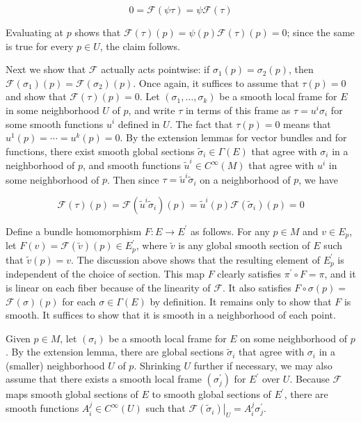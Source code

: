 \documentclass[10pt, letterpaper]{article}
\begin{document}
$$
0=\mathscr{F}(\psi \tau)=\psi \mathscr{F}(\tau)
$$

Evaluating at $p$ shows that $\mathscr{F}(\tau)(p)=\psi(p) \mathscr{F}(\tau)(p)=0$; since the same is true for every $p \in U$, the claim follows.

Next we show that $\mathcal{F}$ actually acts pointwise: if $\sigma_{1}(p)=\sigma_{2}(p)$, then $\mathcal{F}\left(\sigma_{1}\right)(p)=\mathcal{F}\left(\sigma_{2}\right)(p)$. Once again, it suffices to assume that $\tau(p)=0$ and show that $\mathcal{F}(\tau)(p)=0$. Let $\left(\sigma_{1}, \ldots, \sigma_{k}\right)$ be a smooth local frame for $E$ in some neighborhood $U$ of $p$, and write $\tau$ in terms of this frame as $\tau=u^{i} \sigma_{i}$ for some smooth functions $u^{i}$ defined in $U$. The fact that $\tau(p)=0$ means that $u^{1}(p)=\cdots=u^{k}(p)=0$. By the extension lemmas for vector bundles and for functions, there exist smooth global sections $\tilde{\sigma}_{i} \in \Gamma(E)$ that agree with $\sigma_{i}$ in a neighborhood of $p$, and smooth functions $\tilde{u}^{i} \in C^{\infty}(M)$ that agree with $u^{i}$ in some neighborhood of $p$. Then since $\tau=\tilde{u}^{i} \tilde{\sigma}_{i}$ on a neighborhood of $p$, we have

$$
\mathscr{F}(\tau)(p)=\mathscr{F}\left(\tilde{u}^{i} \tilde{\sigma}_{i}\right)(p)=\tilde{u}^{i}(p) \mathscr{F}\left(\tilde{\sigma}_{i}\right)(p)=0
$$

Define a bundle homomorphism $F: E \rightarrow E^{\prime}$ as follows. For any $p \in M$ and $v \in E_{p}$, let $F(v)=\mathcal{F}(\tilde{v})(p) \in E_{p}^{\prime}$, where $\widetilde{v}$ is any global smooth section of $E$ such that $\tilde{v}(p)=v$. The discussion above shows that the resulting element of $E_{p}^{\prime}$ is independent of the choice of section. This map $F$ clearly satisfies $\pi^{\prime} \circ F=\pi$, and it is linear on each fiber because of the linearity of $\mathcal{F}$. It also satisfies $F \circ \sigma(p)=$ $\mathcal{F}(\sigma)(p)$ for each $\sigma \in \Gamma(E)$ by definition. It remains only to show that $F$ is smooth. It suffices to show that it is smooth in a neighborhood of each point.

Given $p \in M$, let $\left(\sigma_{i}\right)$ be a smooth local frame for $E$ on some neighborhood of $p$. By the extension lemma, there are global sections $\widetilde{\sigma}_{i}$ that agree with $\sigma_{i}$ in a (smaller) neighborhood $U$ of $p$. Shrinking $U$ further if necessary, we may also assume that there exists a smooth local frame $\left(\sigma_{j}^{\prime}\right)$ for $E^{\prime}$ over $U$. Because $\mathcal{F}$ maps smooth global sections of $E$ to smooth global sections of $E^{\prime}$, there are smooth functions $A_{i}^{j} \in C^{\infty}(U)$ such that $\left.\mathscr{F}\left(\widetilde{\sigma}_{i}\right)\right|_{U}=A_{i}^{j} \sigma_{j}^{\prime}$.
\end{document}
